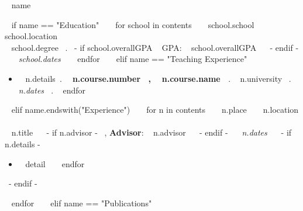 \medskip

\begin{minipage}{\textwidth}
{\huge ~{{ name }}~ }

~{ if name == "Education" }~
  ~{ for school in contents }~
    {\large ~{{ school.school }}~ } \hfill ~{{ school.location }}~ \\
    ~{{ school.degree }}~.
    ~{- if school.overallGPA }~
      GPA: ~{{ school.overallGPA }}~
    ~{- endif -}~
    \hfill {\it ~{{ school.dates }}~}
    \bigskip
  ~{ endfor }~
~{ elif name == "Teaching Experience" }~
  \begin{itemize}
    ~{ for n in contents }~
      \item
        ~{{ n.details}}~.
        {\bf ~{{ n.course.number }}~, ~{{ n.course.name }}~}.
        ~{{ n.university }}~.
        {\it ~{{ n.dates }}~}.
    ~{ endfor }~
  \end{itemize}
~{ elif name.endswith("Experience") }~
  ~{ for n in contents }~
    {\large ~{{ n.place }}~ } \hfill ~{{ n.location }}~ \\
    ~{{ n.title }}~
    ~{- if n.advisor -}~
      , {\bf Advisor}: ~{{ n.advisor }}~
    ~{- endif -}~
    \hfill {\it ~{{ n.dates }}~}
    ~{- if n.details -}~
      \begin{itemize}
      ~{ for detail in n.details }~
        \item ~{{ detail }}~
      ~{ endfor }~
      \end{itemize}
    ~{- endif -}~
    \end{minipage}
    \begin{minipage}{\textwidth}
    \bigskip
  ~{ endfor }~
~{ elif name == "Publications" }~
  \nocite{*}
  \printbibliography[heading=none,type=inproceedings,prefixnumbers=C]
  \end{minipage}
